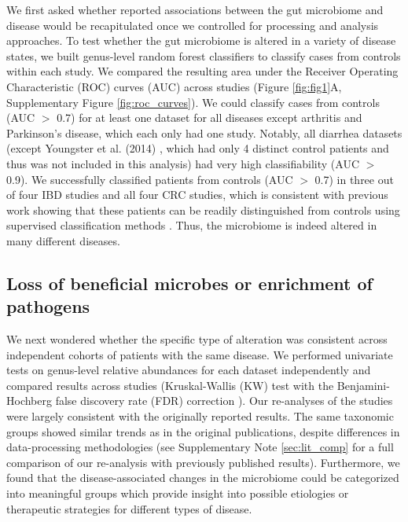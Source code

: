 \documentclass{article}
\begin{document}
We first asked whether reported associations between the gut microbiome and disease would be recapitulated once we controlled for processing and analysis approaches.
To test whether the gut microbiome is altered in a variety of disease states, we built genus-level random forest classifiers to classify cases from controls within each study.
We compared the resulting area under the Receiver Operating Characteristic (ROC) curves (AUC) across studies (Figure \ref{fig:fig1}A, Supplementary Figure \ref{fig:roc_curves}). 
We could classify cases from controls (AUC $>$ 0.7) for at least one dataset for all diseases except arthritis and Parkinson's disease, which each only had one study.
Notably, all diarrhea datasets (except Youngster et al. (2014) \cite{cdi-youngster}, which had only 4 distinct control patients and thus was not included in this analysis) had very high classifiability (AUC $>$ 0.9).
We successfully classified patients from controls (AUC $>$ 0.7) in three out of four IBD studies and all four CRC studies, which is consistent with previous work showing that these patients can be readily distinguished from controls using supervised classification methods \cite{walters2014meta,ibd-papa,crc-baxter,crc-zeller}. 
Thus, the microbiome is indeed altered in many different diseases.

\subsection*{Loss of beneficial microbes or enrichment of pathogens}

We next wondered whether the specific type of alteration was consistent across independent cohorts of patients with the same disease.
We performed univariate tests on genus-level relative abundances for each dataset independently and compared results across studies (Kruskal-Wallis (KW) test with the Benjamini-Hochberg false discovery rate (FDR) correction \cite{benjamini-hochberg}).
Our re-analyses of the studies were largely consistent with the originally reported results.
The same taxonomic groups showed similar trends as in the original publications, despite differences in data-processing methodologies (see Supplementary Note \ref{sec:lit_comp} for a full comparison of our re-analysis with previously published results).  
Furthermore, we found that the disease-associated changes in the microbiome could be categorized into meaningful groups which provide insight into possible etiologies or therapeutic strategies for different types of disease. 
\end{document}
